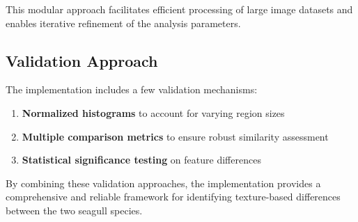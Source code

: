 \documentclass[a4paper,12pt]{report}
\begin{document}
This modular approach facilitates efficient processing of large image datasets and enables iterative refinement of the analysis parameters.

\subsection{Validation Approach}

The implementation includes a few validation mechanisms:

\begin{enumerate}
    \item \textbf{Normalized histograms} to account for varying region sizes
    \item \textbf{Multiple comparison metrics} to ensure robust similarity assessment
    \item \textbf{Statistical significance testing} on feature differences
\end{enumerate}

By combining these validation approaches, the implementation provides a comprehensive and reliable framework for identifying texture-based differences between the two seagull species.





    
\end{document}
